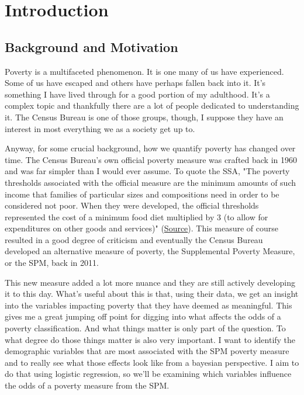 \section*{Introduction}

\subsection*{Background and Motivation}

Poverty is a multifaceted phenomenon. It is one many of us have experienced. Some of us have escaped and others have perhaps fallen back into it. It's something I have lived through for a good portion of my adulthood. It's a complex topic and thankfully there are a lot of people dedicated to understanding it. The Census Bureau is one of those groups, though, I suppose they have an interest in most everything we as a society get up to. 

Anyway, for some crucial background, how we quantify poverty has changed over time. The Census Bureau's own official poverty measure was crafted back in 1960 and was far simpler than I would ever assume. To quote the SSA, "The poverty thresholds associated with the official measure are the minimum amounts of such income that families of particular sizes and compositions need in order to be considered not poor. When they were developed, the official thresholds represented the cost of a minimum food diet multiplied by 3 (to allow for expenditures on other goods and services)" (\href{https://www.ssa.gov/policy/docs/ssb/v75n3/v75n3p55.html}{Source}). This measure of course resulted in a good degree of criticism and eventually the Census Bureau developed an alternative measure of poverty, the Supplemental Poverty Measure, or the SPM, back in 2011.

This new measure added a lot more nuance and they are still actively developing it to this day. What's useful about this is that, using their data, we get an insight into the variables impacting poverty that they have deemed as meaningful. This gives me a great jumping off point for digging into what affects the odds of a poverty classification. And what things matter is only part of the question. To what degree do those things matter is also very important. I want to identify the demographic variables that are most associated with the SPM poverty measure and to really see what those effects look like from a bayesian perspective. I aim to do that using logistic regression, so we'll be examining which variables influence the odds of a poverty measure from the SPM. 

